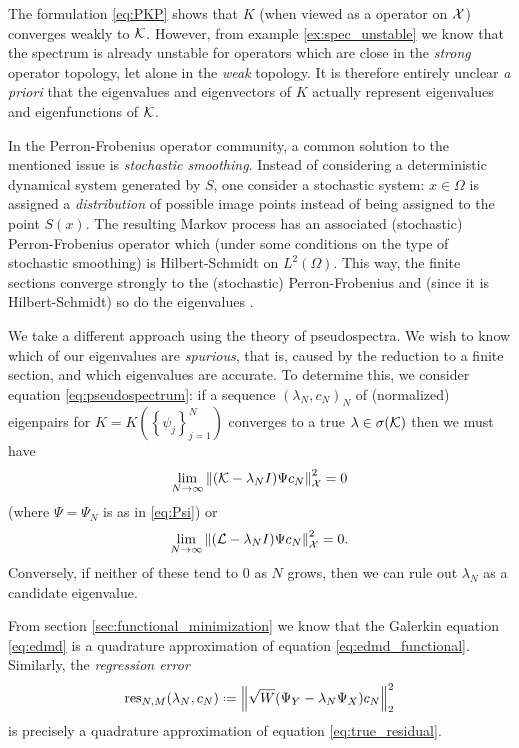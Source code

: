 The formulation \ref{eq:PKP} shows that $K$ (when viewed as a operator on $\mathcal{X}$) 
converges weakly to $\mathcal{K}$. However, from example \ref{ex:spec_unstable} we know that 
the spectrum is already unstable for operators which are close in the \emph{strong} 
operator topology, let alone in the \emph{weak} topology. It is therefore entirely 
unclear \emph{a priori} that the eigenvalues and eigenvectors of $K$ actually represent 
eigenvalues and eigenfunctions of $\mathcal{K}$. 

In the Perron-Frobenius operator community, a common solution to the mentioned issue is 
\emph{stochastic smoothing}. Instead of considering a deterministic dynamical system 
generated by $S$, one consider a stochastic system: $x \in \Omega$ is 
assigned a \emph{distribution} of possible image points instead of being assigned to 
the point $S(x)$. The resulting Markov process has an associated (stochastic) 
Perron-Frobenius operator which (under some conditions on the type of stochastic 
smoothing) is Hilbert-Schmidt on $L^2 (\Omega)$. This way, the finite sections converge 
strongly to the (stochastic) Perron-Frobenius and (since it is Hilbert-Schmidt) so do 
the eigenvalues \cite{attr}. 

We take a different approach using the theory of pseudospectra. We wish to know which of 
our eigenvalues are \emph{spurious}, that is, caused by the reduction to a finite section, 
and which eigenvalues are accurate. To determine this, we consider equation 
\ref{eq:pseudospectrum}: if a sequence $(\lambda_N, c_N)_N$ of (normalized) eigenpairs for 
$K = K(\left\{ \psi_j \right\}_{j=1}^N)$ converges to a true $\lambda \in \sigma (\mathcal{K})$ 
then we must have 
\begin{equation}
    \label{eq:true_residual}
    \lim_{N \to \infty} \left\| (\mathcal{K} - \lambda_N I) \Psi c_N \right\|_{\mathcal{X}}^2 = 0
\end{equation}
(where $\Psi = \Psi_N$ is as in \ref{eq:Psi}) or 
\begin{equation}
    \lim_{N \to \infty} \left\| (\mathcal{L} - \lambda_N I) \Psi c_N \right\|_{\mathcal{X}}^2 = 0 . 
\end{equation}
Conversely, if neither of these tend to $0$ as $N$ grows, then we can rule out 
$\lambda_N$ as a candidate eigenvalue. 

From section \ref{sec:functional_minimization} we know that the Galerkin equation 
\ref{eq:edmd} is a quadrature approximation of equation \ref{eq:edmd_functional}. 
Similarly, the \emph{regression error}
\begin{equation}
    \label{eq:res}
    \res_{N,M} (\lambda_N, c_N) \defeq \left\| \sqrt{W} (\YY - \lambda_N \YX) c_N \right\|_2^2
\end{equation}
is precisely a quadrature approximation of equation \ref{eq:true_residual}. 

